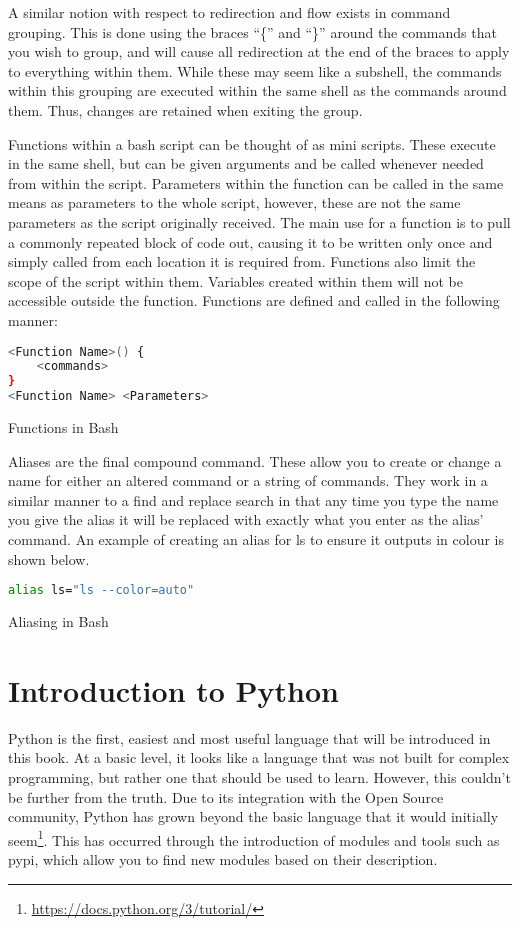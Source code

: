 			A similar notion with respect to redirection and flow exists in command grouping. 
			This is done using the braces ``\{'' and ``\}'' around the commands that you wish to group, and will cause all redirection at the end of the braces to apply to everything within them. 
			While these may seem like a subshell, the commands within this grouping are executed within the same shell as the commands around them. 
			Thus, changes are retained when exiting the group. 

			Functions within a bash script can be thought of as mini scripts. 
			These execute in the same shell, but can be given arguments and be called whenever needed from within the script. 
			Parameters within the function can be called in the same means as parameters to the whole script, however, these are not the same parameters as the script originally received. 
			The main use for a function is to pull a commonly repeated block of code out, causing it to be written only once and simply called from each location it is required from. 
			Functions also limit the scope of the script within them. 
			Variables created within them will not be accessible outside the function. 
			Functions are defined and called in the following manner:
			\begin{code}
			\begin{lstlisting}[language=bash]
<Function Name>() {
	<commands>
}
<Function Name> <Parameters>
			\end{lstlisting}
			\label{code:bashFunctions}
			\caption{Functions in Bash}
			\end{code}

		
			Aliases are the final compound command. 
			These allow you to create or change a name for either an altered command or a string of commands. 
			They work in a similar manner to a find and replace search in that any time you type the name you give the alias it will be replaced with exactly what you enter as the alias' command. 
			An example of creating an alias for ls to ensure it outputs in colour is shown below. 
			\begin{code}
			\begin{lstlisting}[language=bash]
alias ls="ls --color=auto"
			\end{lstlisting}
			\label{code:bashAlias}
			\caption{Aliasing in Bash}
			\end{code}
	\section{Introduction to Python}
		Python is the first, easiest and most useful language that will be introduced in this book.\cite{PythonBoringStuff} 
		At a basic level, it looks like a language that was not built for complex programming, but rather one that should be used to learn. 
		However, this couldn't be further from the truth. 
		Due to its integration with the Open Source community, Python has grown beyond the basic language that it would initially seem\footnote{\url{https://docs.python.org/3/tutorial/}}. 
		This has occurred through the introduction of modules and tools such as pypi, which allow you to find new modules based on their description. 
